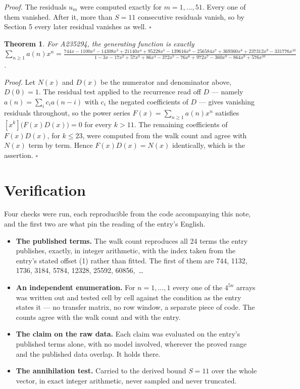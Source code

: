 \documentclass[11pt]{article}
\newtheorem{theorem}{Theorem}
\theoremstyle{definition}
\begin{document}
{\itshape Proof.} The residuals $u_m$ were computed exactly for $m = 1,\dots,51$. Every one of them vanished. After it, more than $S = 11$ consecutive residuals vanish, so by Section 5 every later residual vanishes as well. $\square$

\begin{theorem} For A235294, the generating function is exactly $\sum_{n\ge 1} a(n)x^n = \frac{744x - 1100x^{2} - 14308x^{3} + 21140x^{4} + 95228x^{5} - 139616x^{6} - 256584x^{7} + 369360x^{8} + 237312x^{9} - 331776x^{10}}{1 - 3x - 17x^{2} + 57x^{3} + 86x^{4} - 372x^{5} - 76x^{6} + 972x^{7} - 360x^{8} - 864x^{9} + 576x^{10}}$.\end{theorem}

{\itshape Proof.} Let $N(x)$ and $D(x)$ be the numerator and denominator above, $D(0)=1$. The residual test applied to the recurrence read off $D$ --- namely $a(n) = \sum_i c_i a(n-i)$ with $c_i$ the negated coefficients of $D$ --- gives vanishing residuals throughout, so the power series $F(x)=\sum_{n\ge 1}a(n)x^n$ satisfies $[x^k]\bigl(F(x)D(x)\bigr) = 0$ for every $k > 11$. The remaining coefficients of $F(x)D(x)$, for $k \le 23$, were computed from the walk count and agree with $N(x)$ term by term. Hence $F(x)D(x) = N(x)$ identically, which is the assertion. $\square$

\section{Verification}

Four checks were run, each reproducible from the code accompanying this note, and the first two are what pin the reading of the entry's English.

\begin{itemize}

\item {\bfseries The published terms.} The walk count reproduces all 24 terms the entry publishes, exactly, in integer arithmetic, with the index taken from the entry's stated offset (1) rather than fitted. The first of them are 744, 1132, 1736, 3184, 5784, 12328, 25592, 60856,~\dots

\item {\bfseries An independent enumeration.} For $n = 1,\dots,1$ every one of the $4^{5n}$ arrays was written out and tested cell by cell against the condition as the entry states it --- no transfer matrix, no row window, a separate piece of code. The counts agree with the walk count and with the entry.

\item {\bfseries The claim on the raw data.} Each claim was evaluated on the entry's published terms alone, with no model involved, wherever the proved range and the published data overlap. It holds there.

\item {\bfseries The annihilation test.} Carried to the derived bound $S = 11$ over the whole vector, in exact integer arithmetic, never sampled and never truncated.

\end{itemize}
\end{document}
